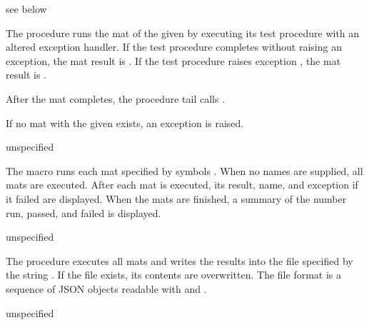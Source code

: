 \begin{procedure}
\end{procedure}
\returns{} see below

The  procedure runs the mat of the given  by
executing its test procedure with an altered exception handler. If the
test procedure completes without raising an exception, the mat result
is . If the test procedure raises exception , the
mat result is .

After the mat completes, the  procedure tail calls
.

If no mat with the given  exists, an exception is raised.

\begin{syntax}
\end{syntax}
\returns{} unspecified

The  macro runs each mat specified by symbols
 \etc.  When no names are supplied, all
mats are executed.  After each mat is executed, its result, name, and
exception if it failed are displayed.  When the mats are finished, a
summary of the number run, passed, and failed is displayed.

\begin{procedure}
\end{procedure}
\returns{} unspecified

The  procedure executes all mats and writes
the results into the file specified by the string . If
the file exists, its contents are overwritten. The file format is a
sequence of JSON objects readable with  and
.

\begin{procedure}
\end{procedure}
\returns{} unspecified

